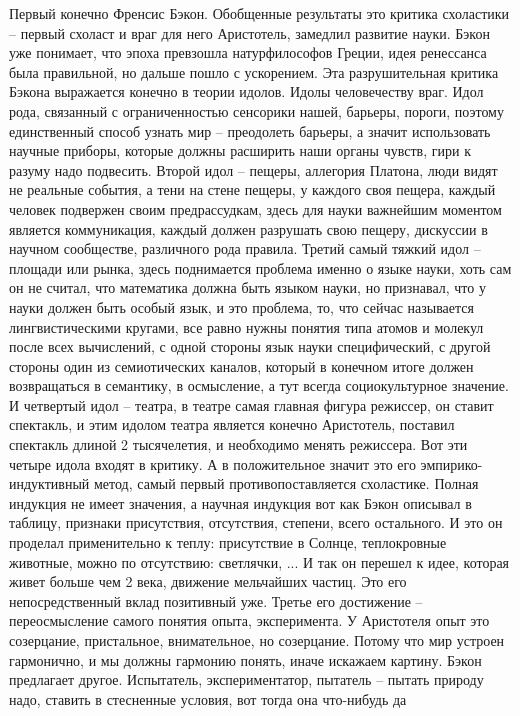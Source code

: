 \documentclass[a4paper, 12pt]{article}
\begin{document}
Первый конечно Френсис Бэкон. Обобщенные результаты это критика 
схоластики -- первый схоласт и враг для него Аристотель, замедлил 
развитие науки. Бэкон уже понимает, что эпоха превзошла натурфилософов 
Греции, идея ренессанса была правильной, но дальше пошло с ускорением. 
Эта разрушительная критика Бэкона выражается конечно в теории идолов. 
Идолы человечеству враг. Идол рода, связанный с ограниченностью 
сенсорики нашей, барьеры, пороги, поэтому единственный способ узнать мир 
-- преодолеть барьеры, а значит использовать научные приборы, которые 
должны расширить наши органы чувств, гири к разуму надо подвесить. 
Второй идол -- пещеры, аллегория Платона, люди видят не реальные 
события, а тени на стене пещеры, у каждого своя пещера, каждый человек 
подвержен своим предрассудкам, здесь для науки важнейшим моментом 
является коммуникация, каждый должен разрушать свою пещеру, дискуссии 
в научном сообществе, различного рода правила. Третий самый тяжкий идол 
-- площади или рынка, здесь поднимается проблема именно о языке науки, 
хоть сам он не считал, что математика должна быть языком науки, но 
признавал, что у науки должен быть особый язык, и это проблема, то, что 
сейчас называется лингвистическими кругами, все равно нужны понятия типа 
атомов и молекул после всех вычислений, с одной стороны язык науки 
специфический, с другой стороны один из семиотических каналов, который 
в конечном итоге должен возвращаться в семантику, в осмысление, а тут 
всегда социокультурное значение. И четвертый идол -- театра, в театре 
самая главная фигура режиссер, он ставит спектакль, и этим идолом театра 
является конечно Аристотель, поставил спектакль длиной 2 тысячелетия, 
и необходимо менять режиссера. Вот эти четыре идола входят в критику. 
А в положительное значит это его эмпирико-индуктивный метод, самый 
первый противопоставляется схоластике. Полная индукция не имеет 
значения, а научная индукция вот как Бэкон описывал в таблицу, признаки 
присутствия, отсутствия, степени, всего остального. И это он проделал 
применительно к теплу: присутствие в Солнце, теплокровные животные, 
можно по отсутствию: светлячки, ... И так он перешел к идее, которая 
живет больше чем 2 века, движение мельчайших частиц. Это его 
непосредственный вклад позитивный уже. Третье его достижение -- 
переосмысление самого понятия опыта, эксперимента. У Аристотеля опыт это 
созерцание, пристальное, внимательное, но созерцание. Потому что мир 
устроен гармонично, и мы должны гармонию понять, иначе искажаем картину. 
Бэкон предлагает другое. Испытатель, экспериментатор, пытатель -- пытать 
природу надо, ставить в стесненные условия, вот тогда она что-нибудь да 
\end{document}
